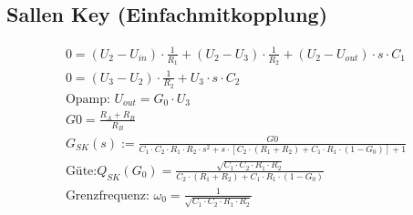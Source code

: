 \subsection{Sallen Key (Einfachmitkopplung)}
\begin{figure}[ht]
	\begin{center}
		 \qquad
	\end{center}
\end{figure}
\begin{gather}
0=(U_2-U_{in})\cdot \frac{1}{R_1}+(U_2-U_3)\cdot \frac{1}{R_2}+(U_2-U_{out})\cdot s\cdot C_1\\
0=(U_3-U_2)\cdot \frac{1}{R_2}+U_3\cdot s\cdot C_2\\
\text{Opamp: }U_{out}=G_0\cdot U_3\\
G0=\frac{R_{A}+R_{B}}{R_{B}}\\
G_{SK}(s):=\frac{G0}{C_1\cdot C_2\cdot R_1\cdot R_2\cdot s^2+s\cdot [C_2\cdot
(R_1+R_2)+C_1\cdot R_1\cdot (1-G_0)]+1}\\
\text{Güte:
}Q_{SK}(G_0)=\frac{\sqrt{C_1\cdot C_2\cdot R_1\cdot R_2}}{C_2\cdot (R_1+R_2)+C_1\cdot R_1\cdot (1-G_0)}\\
\text{Grenzfrequenz: }\omega_0=\frac{1}{\sqrt{C_1\cdot C_2\cdot R_1\cdot R_2}}
\end{gather}
